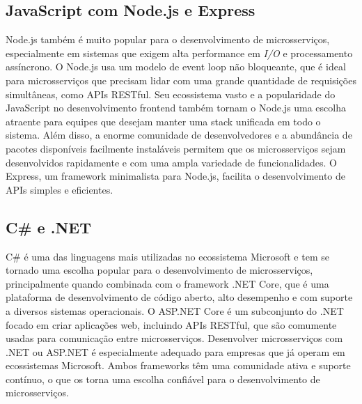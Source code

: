 \subsection{JavaScript com Node.js e Express}

Node.js também é muito popular para o desenvolvimento de microsserviços, especialmente em sistemas que exigem alta performance em \emph{I/O} e processamento assíncrono. O Node.js usa um modelo de event loop não bloqueante, que é ideal para microsserviços que precisam lidar com uma grande quantidade de requisições simultâneas, como APIs RESTful. Seu ecossistema vasto e a popularidade do JavaScript no desenvolvimento frontend também tornam o Node.js uma escolha atraente para equipes que desejam manter uma stack unificada em todo o sistema. Além disso, a enorme comunidade de desenvolvedores e a abundância de pacotes disponíveis facilmente instaláveis permitem que os microsserviços sejam desenvolvidos rapidamente e com uma ampla variedade de funcionalidades. O Express, um framework minimalista para Node.js, facilita o desenvolvimento de APIs simples e eficientes. 
\cite{expressjs,nodejs}

\subsection{C\# e .NET}

C\# é uma das linguagens mais utilizadas no ecossistema Microsoft e tem se tornado uma escolha popular para o desenvolvimento de microsserviços, principalmente quando combinada com o framework .NET Core, que é uma plataforma de desenvolvimento de código aberto, alto desempenho e com suporte a diversos sistemas operacionais. O ASP.NET Core é um subconjunto do .NET focado em criar aplicações web, incluindo APIs RESTful, que são comumente usadas para comunicação entre microsserviços. Desenvolver microsserviços com .NET ou ASP.NET é especialmente adequado para empresas que já operam em ecossistemas Microsoft. Ambos frameworks têm uma comunidade ativa e suporte contínuo, o que os torna uma escolha confiável para o desenvolvimento de microsserviços. 
\cite{dotnetcore,aspnetcore}



